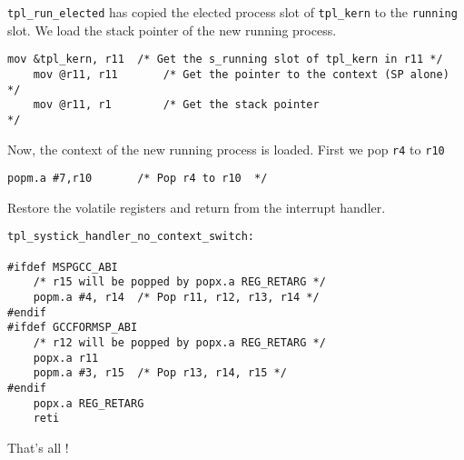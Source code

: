 \documentclass[11pt, oneside]{article}   	%
\begin{document}
\lstinline{tpl_run_elected} has copied the elected process slot of \lstinline{tpl_kern} to the \lstinline{running} slot. We load the stack pointer of the new running process.

\begin{lstlisting}[basicstyle=\footnotesize\ttfamily]
    mov &tpl_kern, r11  /* Get the s_running slot of tpl_kern in r11 */
    mov @r11, r11       /* Get the pointer to the context (SP alone) */
    mov @r11, r1        /* Get the stack pointer                     */
\end{lstlisting}

Now, the context of the new running process is loaded. First we pop \lstinline{r4} to \lstinline{r10}

\begin{lstlisting}[basicstyle=\footnotesize\ttfamily]
    popm.a #7,r10       /* Pop r4 to r10  */
\end{lstlisting}



Restore the volatile registers and return from the interrupt handler.

\begin{lstlisting}[basicstyle=\footnotesize\ttfamily]
tpl_systick_handler_no_context_switch:

#ifdef MSPGCC_ABI
    /* r15 will be popped by popx.a REG_RETARG */
    popm.a #4, r14  /* Pop r11, r12, r13, r14 */
#endif
#ifdef GCCFORMSP_ABI
    /* r12 will be popped by popx.a REG_RETARG */
    popx.a r11
    popm.a #3, r15  /* Pop r13, r14, r15 */
#endif
    popx.a REG_RETARG
    reti
\end{lstlisting}

That's all !



\end{document}
